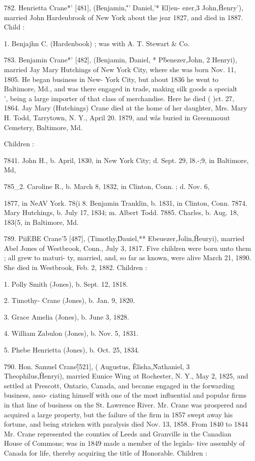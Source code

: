 \documentclass{book}
\begin{document}
782. Henrietta Crane*' [481], (Benjamin,\^'' Daniel,'* El)en- 
ezer,3 John,\^ Henry'), married John Hardeubrook of New York 
about the jear 1827, and died in 1887. Child : 

1. Benjajhn C. (Hardenbook) ; was with A. T. Stewart \& Co. 

783. Benjamin Crane*' [482], (Benjamin, \^ Daniel, * P\^benezer,\^ 
John, 2 Henryi), married Jay Mary Hutchings of New York City, 
where she was born Nov. 11, 1805. He began business in New- 
York City, but about 1836 he went to Baltimore, Md., and was 
there engaged in trade, making silk goods a specialt\\', being a 
large importer of that class of merchandise. Here he died ( )ct. 
27, 1864. Jay Mary (Hutchings) Crane died at the home of 
her daughter, Mrs. Mary H. Todd, Tarrytown, N. Y., April 20. 
1879, and w\^as buried in Greenmouut Cemetery, Baltimore, Md. 

Children : 

7841. John H., b. April, 1830, in New York City; d. Sept. 29, l8.-;9, 
in Baltimore, Md, 




785\_2. Caroline R., b. March 8, 1832, in Clinton, Conn. ; d. Nov. 6, 

1877, in NeAV York. 
78(i 8. Benjamin Tranklin, b. 1831, in Clinton, Conn. 
7874. Mary Hutchings, b. July 17, 1834; m. Albert Todd. 
7885. Charles, b. Aug. 18, 183(5, in Baltimore, Md. 

789. PiiEBE Crane'5 [487], (Timothy,\^ Dauiel,** Ebeuezer,\^ 
Jolin,\^ Heuryi), married Abel Jones of Westbrook, Conn., July 
3, 1817. Five children were born unto them ; all grew to maturi- 
ty, married, and, so far as known, were alive March 21, 1890. 
She died in Westbrook, Feb. 2, 1882. Children : 

1. Polly Smith (Jones), b. Sept. 12, 1818. 

2. Timothy- Crane (Jones), b. Jan. 9, 1820. 

3. Grace Amelia (Jones), b. June 3, 1828. 

4. William Zabulon (Jones), b. Nov. 5, 1831. 

5. Phebe Henrietta (Jones), b. Oct. 25, 1834. 

790. Hon. Samuel Crane\^ [521], ( Augustus, \^ Elisha,\^ 
Nathaniel, 3 Theophilus,\^ Henryi), married Eunice Wing at 
Rochester, N. Y., May 2, 1825, and settled at Prescott, Ontario, 
Canada, and became engaged in the forwarding business, asso- 
ciating himself with one of the most influential and popular firms 
in that line of business on the St. Lawrence River. Mr. Crane 
was prospered and acquired a large property, but the failure of 
the firm in 1857 swept away his fortune, and being stricken with 
paralysis died Nov. 13, 1858. From 1840 to 1844 Mr. Crane 
represented the counties of Leeds and Granville in the Canadian 
House of Commons; was in 1849 made a member of the legisla- 
tive assembly of Canada for life, thereby acquiring the title of 
Honorable. Children : 
\end{document}
